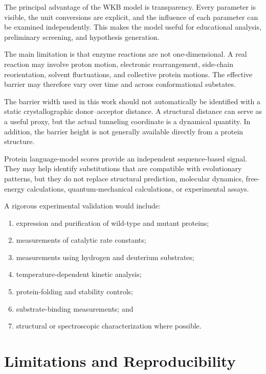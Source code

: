 \documentclass[11pt,a4paper]{article}
\begin{document}
The principal advantage of the WKB model is transparency. Every parameter is
visible, the unit conversions are explicit, and the influence of each parameter
can be examined independently. This makes the model useful for educational
analysis, preliminary screening, and hypothesis generation.

The main limitation is that enzyme reactions are not one-dimensional. A real
reaction may involve proton motion, electronic rearrangement, side-chain
reorientation, solvent fluctuations, and collective protein motions. The
effective barrier may therefore vary over time and across conformational
substates.

The barrier width used in this work should not automatically be identified with
a static crystallographic donor--acceptor distance. A structural distance can
serve as a useful proxy, but the actual tunneling coordinate is a dynamical
quantity. In addition, the barrier height is not generally available directly
from a protein structure.

Protein language-model scores provide an independent sequence-based signal.
They may help identify substitutions that are compatible with evolutionary
patterns, but they do not replace structural prediction, molecular dynamics,
free-energy calculations, quantum-mechanical calculations, or experimental
assays.

A rigorous experimental validation would include:
\begin{enumerate}[label=\arabic*.]
    \item expression and purification of wild-type and mutant proteins;
    \item measurements of catalytic rate constants;
    \item measurements using hydrogen and deuterium substrates;
    \item temperature-dependent kinetic analysis;
    \item protein-folding and stability controls;
    \item substrate-binding measurements; and
    \item structural or spectroscopic characterization where possible.
\end{enumerate}

\section{Limitations and Reproducibility}
\end{document}
